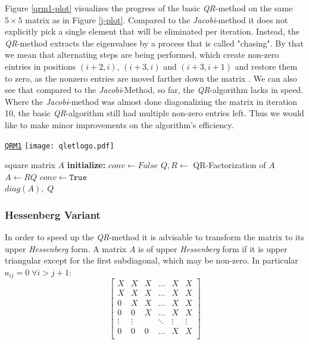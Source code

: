 \documentclass[12pt]{article}
\begin{document}
Figure \ref{qrm1-plot} visualizes the progress of the basic \textit{QR}-method on the same $5 \times 5$ matrix as in Figure \ref{j-plot}. Compared to the \textit{Jacobi}-method it does not explicitly pick a single element that will be eliminated per iteration. Instead, the \textit{QR}-method extracts the eigenvalues by a process that is called "chasing". By that we mean that alternating steps are being performed, which create non-zero eintries in positions $(i+2, i)$, $(i+3, i)$ and $(i+3, i+1)$ and restore them to zero, as the nonzero entries are moved farther down the matrix \cite{NLA}. We can also see that compared to the \textit{Jacobi}-Method, so far, the \textit{QR}-algorithm lacks in speed. Where the \textit{Jacobi}-method was almost done diagonalizing the matrix in iteration 10, the basic \textit{QR}-algorithm still had multiple non-zero entries left. Thus we would like to make minor improvements on the algorithm's efficiency.
\begin{algorithm}
\caption{\href {https://github.com/thsis/NIS18/blob/master/algorithms/eigen.py}{\texttt{QRM1}}  \protect\texttt{[image: qletlogo.pdf]}}
\label{qr1-meth}
  \begin{algorithmic}[1]
    \Require square matrix $A$
    \Statex \textbf{initialize: } $conv \gets False$
      \State $Q, R \gets$ QR-Factorization of $A$
      \State $A \gets RQ$
        \State $conv \gets \texttt{True}$
      \EndIf
    \EndWhile\\
    \Return $diag\left(A\right),\; Q$
  \end{algorithmic}
\end{algorithm}


\subsubsection{Hessenberg Variant}

In order to speed up the \textit{QR}-method it is advisable to transform the matrix to its upper \textit{Hessenberg} form. A matrix $A$ is of upper \textit{Hessenberg} form if it is upper triangular except for the first subdiagonal, which may be non-zero. In particular $a_{ij} = 0\; \forall i > j + 1$:
$$
\begin{bmatrix}
X & X & X  & \dots &  X & X\\
X & X & X &  \dots &  X & X\\
0 & X & X &  \dots &  X & X\\
0 & 0 & X &  \dots &  X & X \\
\vdots &  \vdots & & \ddots  & \vdots  & \vdots\\
0 & 0 & 0 &  \dots &  X & X \\
\end{bmatrix}$$
\end{document}
